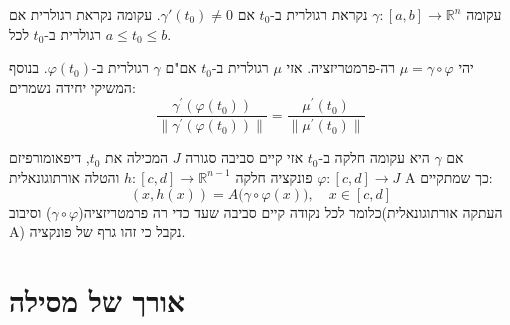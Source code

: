 \documentclass{tstextbook}
\begin{document}
\begin{definition}
עקומה \(\gamma:[a,b]\to \mathbb{R}^{n}\) נקראת רגולרית ב-\(t_{0}\) אם \(\gamma'(t_{0})\neq 0\). עקומה נקראת רגולרית אם רגולרית ב-\(t_{0}\) לכל \(a\leq t_{0}\leq b\).

\end{definition}
\begin{proposition}
יהי \(\mu=\gamma \circ \varphi\) רה-פרמטריזציה. אזי \(\mu\) רגולרית ב-\(t_{0}\) אם"ם \(\gamma\) רגולרית ב-\(\varphi(t_{0})\). בנוסף המשיקי יחידה נשמרים:
$${\frac{\gamma^{\prime}(\varphi(t_{0}))}{\|\gamma^{\prime}(\varphi(t_{0}))\|}}={\frac{\mu^{\prime}(t_{0})}{\|\mu^{\prime}(t_{0})\|}}$$

\end{proposition}
\begin{proposition}
אם \(\gamma\) היא עקומה חלקה ב-\(t_{0}\) אזי קיים סביבה סגורה \(J\) המכילה את \(t_{0}\), דיפאומורפיזם \(\varphi:[c,d]\to J\) פונקציה חלקה \(h:[c,d]\to \mathbb{R}^{n-1}\) והטלה אורתוגונאלית A כך שמתקיים:
$$(x,h(x))=A{\big(}\gamma\circ\varphi(x){\big)},\quad x\in[c,d]$$
כלומר לכל נקודה קיים סביבה שעד כדי רה פרמטריזציה(\(\gamma \circ \varphi\)) וסיבוב(העתקה אורתוגונאלית A) נקבל כי זהו גרף של פונקציה.

\end{proposition}
\section{אורך של מסילה}
\end{document}

